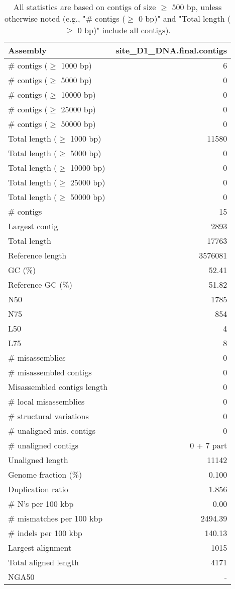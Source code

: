 \documentclass[12pt,a4paper]{article}
\begin{document}
\begin{table}[ht]
\begin{center}
\caption{All statistics are based on contigs of size $\geq$ 500 bp, unless otherwise noted (e.g., "\# contigs ($\geq$ 0 bp)" and "Total length ($\geq$ 0 bp)" include all contigs).}
\begin{tabular}{|l*{1}{|r}|}
\hline
Assembly & site\_D1\_DNA.final.contigs \\ \hline
\# contigs ($\geq$ 1000 bp) & 6 \\ \hline
\# contigs ($\geq$ 5000 bp) & 0 \\ \hline
\# contigs ($\geq$ 10000 bp) & 0 \\ \hline
\# contigs ($\geq$ 25000 bp) & 0 \\ \hline
\# contigs ($\geq$ 50000 bp) & 0 \\ \hline
Total length ($\geq$ 1000 bp) & 11580 \\ \hline
Total length ($\geq$ 5000 bp) & 0 \\ \hline
Total length ($\geq$ 10000 bp) & 0 \\ \hline
Total length ($\geq$ 25000 bp) & 0 \\ \hline
Total length ($\geq$ 50000 bp) & 0 \\ \hline
\# contigs & 15 \\ \hline
Largest contig & 2893 \\ \hline
Total length & 17763 \\ \hline
Reference length & 3576081 \\ \hline
GC (\%) & 52.41 \\ \hline
Reference GC (\%) & 51.82 \\ \hline
N50 & 1785 \\ \hline
N75 & 854 \\ \hline
L50 & 4 \\ \hline
L75 & 8 \\ \hline
\# misassemblies & 0 \\ \hline
\# misassembled contigs & 0 \\ \hline
Misassembled contigs length & 0 \\ \hline
\# local misassemblies & 0 \\ \hline
\# structural variations & 0 \\ \hline
\# unaligned mis. contigs & 0 \\ \hline
\# unaligned contigs & 0 + 7 part \\ \hline
Unaligned length & 11142 \\ \hline
Genome fraction (\%) & 0.100 \\ \hline
Duplication ratio & 1.856 \\ \hline
\# N's per 100 kbp & 0.00 \\ \hline
\# mismatches per 100 kbp & 2494.39 \\ \hline
\# indels per 100 kbp & 140.13 \\ \hline
Largest alignment & 1015 \\ \hline
Total aligned length & 4171 \\ \hline
NGA50 & - \\ \hline
\end{tabular}
\end{center}
\end{table}
\end{document}
